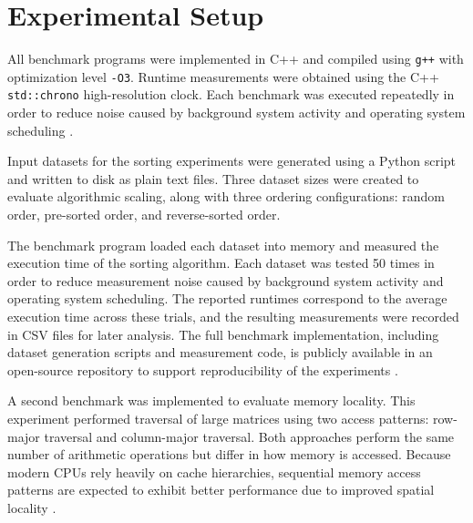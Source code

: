 \section{Experimental Setup}

All benchmark programs were implemented in C++ and compiled using \texttt{g++} with optimization level \texttt{-O3}. Runtime measurements were obtained using the C++ \texttt{std::chrono} high-resolution clock. Each benchmark was executed repeatedly in order to reduce noise caused by background system activity and operating system scheduling \cite{georges2007}.

Input datasets for the sorting experiments were generated using a Python script and written to disk as plain text files. Three dataset sizes were created to evaluate algorithmic scaling, along with three ordering configurations: random order, pre-sorted order, and reverse-sorted order.

The benchmark program loaded each dataset into memory and measured the execution time of the sorting algorithm. Each dataset was tested 50 times in order to reduce measurement noise caused by background system activity and operating system scheduling. The reported runtimes correspond to the average execution time across these trials, and the resulting measurements were recorded in CSV files for later analysis. The full benchmark implementation, including dataset generation scripts and measurement code, is publicly available in an open-source repository to support reproducibility of the experiments \cite{balkovec2026benchmarks}.

A second benchmark was implemented to evaluate memory locality. This experiment performed traversal of large matrices using two access patterns: row-major traversal and column-major traversal. Both approaches perform the same number of arithmetic operations but differ in how memory is accessed. Because modern CPUs rely heavily on cache hierarchies, sequential memory access patterns are expected to exhibit better performance due to improved spatial locality \cite{lam1991, mckee2004}.
